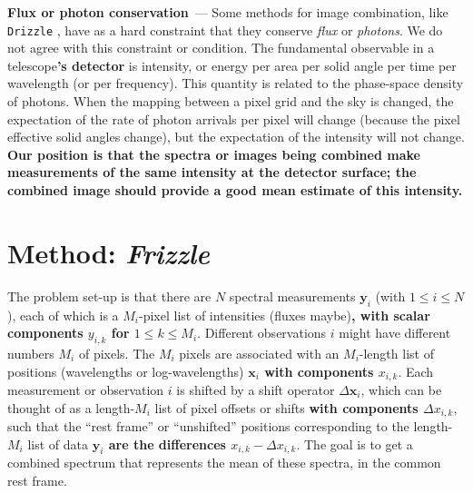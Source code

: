 \documentclass[modern, linenumbers]{aastex631}
\renewcommand{\paragraph}[1]{\medskip\par\noindent\textbf{#1}~---}
\newcommand{\name}{\textsl{Frizzle}}
\newcommand{\modified}[1]{\textcolor{Emerald}{\textbf{#1}}}
\begin{document}
\paragraph{Flux or photon conservation}
Some methods for image combination, like \texttt{Drizzle} \citep{drizzle}, have as a hard constraint that they conserve \emph{flux} or \emph{photons}.
We do not agree with this constraint or condition.
The fundamental observable in a telescope\modified{'s detector} is intensity, or energy per area per solid angle per time per wavelength (or per frequency).
This quantity is related to the phase-space density of photons.
When the mapping between a pixel grid and the sky is changed, the expectation of the rate of photon arrivals per pixel will change (because the pixel effective solid angles change), but the expectation of the intensity will not change.
\modified{Our position is that the spectra or images being combined make measurements of the same intensity at the detector surface; the combined image should provide a good mean estimate of this intensity.}

\section{Method: \name}\label{sec:method}




The problem set-up is that there are $N$ spectral measurements \modified{$\mathbf{y}_i$} (with $1\leq i\leq N$), each of which is a $M_i$-pixel list of intensities (fluxes maybe)\modified{, with scalar components $y_{i,k}$ for $1\leq k\leq M_i$}.
Different observations $i$ might have different numbers $M_i$ of pixels.
The $M_i$ pixels are associated with an $M_i$-length list of positions (wavelengths or log-wavelengths) \modified{$\mathbf{x}_i$ with components $x_{i,k}$}.
Each measurement or observation $i$ is shifted by a shift operator \modified{$\Delta\mathbf{x}_i$}, which can be thought of as a length-$M_i$ list of pixel offsets or shifts \modified{with components $\Delta x_{i,k}$}, such that the ``rest frame'' or ``unshifted'' positions corresponding to the length-$M_i$ list of data \modified{$\mathbf{y}_i$ are the differences $x_{i,k} - \Delta x_{i,k}$}.
The goal is to get a combined spectrum that represents the mean of these spectra, in the common rest frame.
\end{document}
